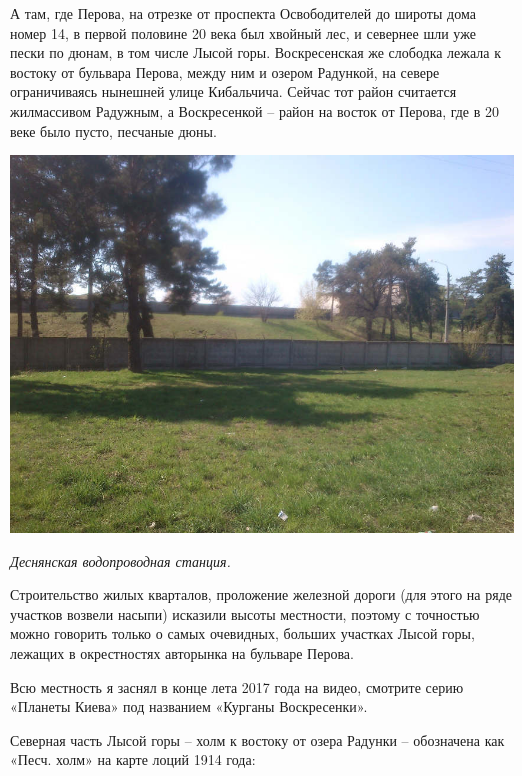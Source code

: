 А там, где Перова, на отрезке от проспекта Освободителей до широты дома номер 14, в первой половине 20 века был хвойный лес, и севернее шли уже пески по дюнам, в том числе Лысой горы. Воскресенская же слободка лежала к востоку от бульвара Перова, между ним и озером Радункой, на севере ограничиваясь нынешней улице Кибальчича. Сейчас тот район считается жилмассивом Радужным, а Воскресенкой – район на восток от Перова, где в 20 веке было пусто, песчаные дюны.
\vspace*{\fill}
\begin{center}
\includegraphics[width=\textwidth]{chast-gorodki/lysaya/levlys01.jpg}

\textit{Деснянская водопроводная станция.}
\end{center}
\vspace*{\fill}
Строительство жилых кварталов, проложение железной дороги (для этого на ряде участков возвели насыпи) исказили высоты местности, поэтому с точностью можно говорить только о самых очевидных, больших участках Лысой горы, лежащих в окрестностях авторынка на бульваре Перова.

Всю местность я заснял в конце лета 2017 года на видео, смотрите серию «Планеты Киева» под названием «Курганы Воскресенки».

\newpage

Северная часть Лысой горы – холм к востоку от озера Радунки – обозначена как «Песч. холм» на карте лоций 1914 года:

